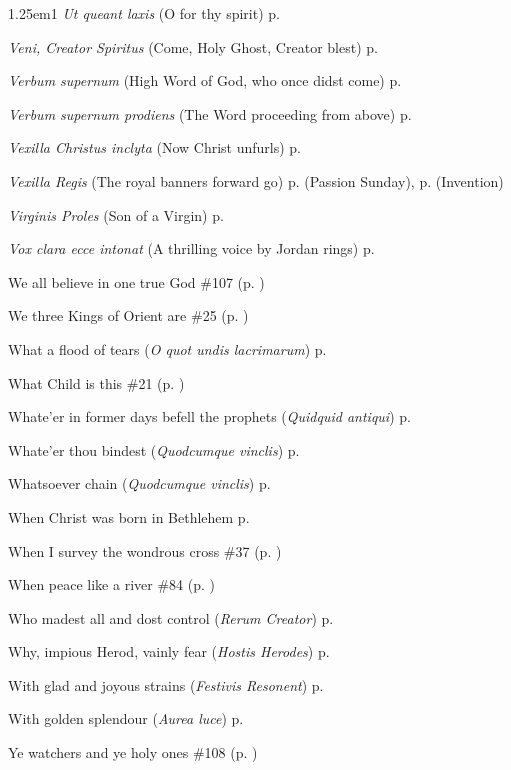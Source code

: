 \begin{hangparas}{1.25em}{1}
\textit{Ut queant laxis} (O for thy spirit) \dotfill p. \pageref{JohnBaptistEvensong}
\par\noindent
\textit{Veni, Creator Spiritus} (Come, Holy Ghost, Creator blest) \dotfill p. \pageref{WhitsundayEvensongHymn}
\par\noindent
\textit{Verbum supernum} (High Word of God, who once didst come) \dotfill p. \pageref{FirstAdventInvitatory}
\par\noindent
\textit{Verbum supernum prodiens} (The Word proceeding from above) \dotfill p. \pageref{CorpusChristiMattins}
\par\noindent
\textit{Vexilla Christus inclyta} (Now Christ unfurls) \dotfill p. \pageref{ChristTheKingMattins}
\par\noindent
\textit{Vexilla Regis} (The royal banners forward go) \dotfill p. \pageref{PassionSundayEvensong} (Passion Sunday), p. \pageref{InventionEvensong} (Invention)
\par\noindent
\textit{Virginis Proles} (Son of a Virgin) \dotfill p. \pageref{VirginInvitatory}
\par\noindent
\textit{Vox clara ecce intonat} (A thrilling voice by Jordan rings) \dotfill p. \pageref{FirstAdventMattins}
\par\noindent
We all believe in one true God \dotfill \#107 (p. \pageref{Hymn107})
\par\noindent
We three Kings of Orient are \dotfill \#25 (p. \pageref{Hymn25})
\par\noindent
What a flood of tears (\textit{O quot undis lacrimarum}) \dotfill p. \pageref{SevenSorrowsInvitatory}
\par\noindent
What Child is this \dotfill \#21 (p. \pageref{Hymn21})
\par\noindent
Whate'er in former days befell the prophets (\textit{Quidquid antiqui}) \dotfill p. \pageref{BenedictInvitatory}
\par\noindent
Whate'er thou bindest (\textit{Quodcumque vinclis}) \dotfill p. \pageref{LammasInvitatory}
\par\noindent
Whatsoever chain (\textit{Quodcumque vinclis}) \dotfill p. \pageref{PeterAntiochEvensong}
\par\noindent
When Christ was born in Bethlehem \dotfill p. \pageref{WalsinghamMattins}
\par\noindent
When I survey the wondrous cross \dotfill \#37 (p. \pageref{Hymn37})
\par\noindent
When peace like a river \dotfill \#84 (p. \pageref{Hymn84})
\par\noindent
Who madest all and dost control (\textit{Rerum Creator}) \dotfill p. \pageref{WednesdayInvitatory}
\par\noindent
Why, impious Herod, vainly fear (\textit{Hostis Herodes}) \dotfill p. \pageref{EpiphanyEvensongHymn}
\par\noindent
With glad and joyous strains (\textit{Festivis Resonent}) \dotfill p. \pageref{PreciousBloodEvensong}
\par\noindent
With golden splendour (\textit{Aurea luce}) \dotfill p. \pageref{PeterEvensong}
\par\noindent
Ye watchers and ye holy ones \dotfill \#108 (p. \pageref{Hymn108})
\end{hangparas}

\normalsize

